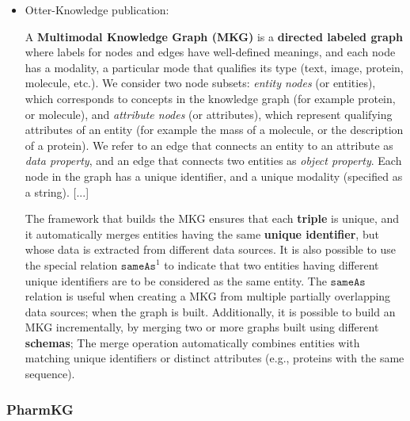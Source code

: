 \documentclass{article}
\begin{document}
\begin{itemize}

\item Otter-Knowledge publication:
\begin{displayquote}
A \textbf{Multimodal Knowledge Graph (MKG)} is a \textbf{directed labeled graph} where labels for nodes and edges have well-defined meanings, and each node has a modality, a particular mode that qualifies its type (text, image, protein, molecule, etc.). We consider two node subsets: \textit{entity nodes} (or entities), which corresponds to concepts in the knowledge graph (for example protein, or molecule), and \textit{attribute nodes} (or attributes), which represent qualifying attributes of an entity (for example the mass of a molecule, or the description of a protein). We refer to an edge that connects an entity to an attribute as \textit{data property}, and an edge that connects two entities as \textit{object property}. Each node in the graph has a unique identifier, and a unique modality (specified as a string).
[...]

The framework that builds the MKG ensures that each \textbf{triple} is unique, and it automatically merges entities having the same \textbf{unique identifier}, but whose data is extracted from different data sources. It is also possible to use the special relation $ \texttt{sameAs}^1 $ to indicate that two entities having different unique identifiers are to be considered as the same entity. The $ \texttt{sameAs} $ relation is useful when creating a MKG from multiple partially overlapping data sources; when the graph is built. Additionally, it is possible to build an MKG incrementally, by merging two or more graphs built using different \textbf{schemas}; The merge operation automatically combines entities with matching unique identifiers or distinct attributes (e.g., proteins with the same sequence).
\end{displayquote}

\end{itemize}


\subsubsection{PharmKG}
\end{document}
